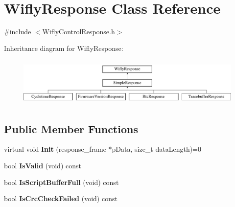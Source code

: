 \hypertarget{class_wifly_response}{\section{Wifly\-Response Class Reference}
\label{class_wifly_response}
}


{\ttfamily \#include $<$Wifly\-Control\-Response.\-h$>$}

Inheritance diagram for Wifly\-Response\-:\begin{figure}[H]
\begin{center}
\leavevmode
\includegraphics[height=2.441860cm]{class_wifly_response}
\end{center}
\end{figure}
\subsection*{Public Member Functions}
\begin{DoxyCompactItemize}
\item 
\hypertarget{class_wifly_response_aa9df8428eafc9e1cf1bc987aaf18eb79}{virtual void {\bfseries Init} (response\-\_\-frame $\ast$p\-Data, size\-\_\-t data\-Length)=0}\label{class_wifly_response_aa9df8428eafc9e1cf1bc987aaf18eb79}

\item 
\hypertarget{class_wifly_response_a78274601001f1f8e112e1c59ea59f9df}{bool {\bfseries Is\-Valid} (void) const }\label{class_wifly_response_a78274601001f1f8e112e1c59ea59f9df}

\item 
\hypertarget{class_wifly_response_a4b5e58113cf23e0723d0a2d22e0c8acb}{bool {\bfseries Is\-Script\-Buffer\-Full} (void) const }\label{class_wifly_response_a4b5e58113cf23e0723d0a2d22e0c8acb}

\item 
\hypertarget{class_wifly_response_ae28f6e581ab7864969d2bf70b1c44ee0}{bool {\bfseries Is\-Crc\-Check\-Failed} (void) const }\label{class_wifly_response_ae28f6e581ab7864969d2bf70b1c44ee0}

\end{DoxyCompactItemize}

